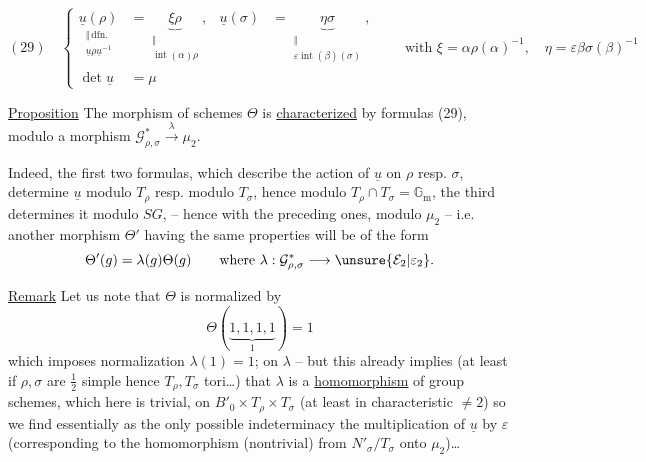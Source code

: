 
\[
(29)\quad
\left\{\begin{aligned}
\underset{\substack{\Vert\,\mathrm{dfn.}\\\underline{u}\rho\underline{u}^{-1}}}{\underline{u}(\rho)}
 &=\underset{\substack{\Vert\\\operatorname{int}(\alpha)\rho}}{\underbrace{\xi\rho}},
 &\underline{u}(\sigma)&=\underset{\substack{\Vert\\\varepsilon\operatorname{int}(\beta)(\sigma)}}{\underbrace{\eta\sigma}},\\[1ex]
\det\underline{u}&=\mu
\end{aligned}\right.
\qquad\text{with }\xi=\alpha\rho(\alpha)^{-1},\quad
\eta=\varepsilon\beta\sigma(\beta)^{-1}
\]

\uline{Proposition} The morphism of schemes $\Theta$ is
\uline{characterized} by formulas (29), modulo a morphism
$\mathcal{G}_{\rho,\sigma}^{*}\xrightarrow{\lambda}\mu_2$.

Indeed, the first two formulas, which describe the action of
$\underline{u}$ on $\rho$ resp. $\sigma$, determine $\underline{u}$ modulo
$T_\rho$ resp. modulo $T_\sigma$, hence  modulo
$T_\rho\cap T_\sigma=\mathbb{G}_{\mathrm m}$, the third determines it
modulo $SG$, -- hence with the preceding ones, modulo $\mu_2$ -- i.e. another
morphism $\Theta'$ having the same properties
will be of the form
\[
\Theta'(g)=\lambda(g)\Theta(g)\qquad\text{where }\lambda:
\mathcal{G}_{\rho,\sigma}^{*}\longrightarrow\unsure{\mathcal{E}_2|\varepsilon_2}.
\]

\uline{Remark} Let us note  that 
$\Theta$ is normalized by
\[
\Theta(\underbrace{1,1,1,1}_{1})=1
\]
which imposes 
normalization $\lambda(1)=1$; on $\lambda$ -- but  this
already implies (at least if $\rho,\sigma$ are $\frac12$ simple hence
$T_\rho,T_\sigma$ tori\ldots) that $\lambda$ is a \uline{homomorphism}
of group schemes, which here is  trivial,
on  $B'_0\times T_\rho\times T_\sigma$
(at least in characteristic $\ne2$) so we find essentially as the only
possible indeterminacy the multiplication  of
$\underline{u}$ by $\varepsilon$ 
(corresponding to the  homomorphism (nontrivial) from
$N'_\sigma/T_\sigma$ onto $\mu_2$)\ldots\ 

